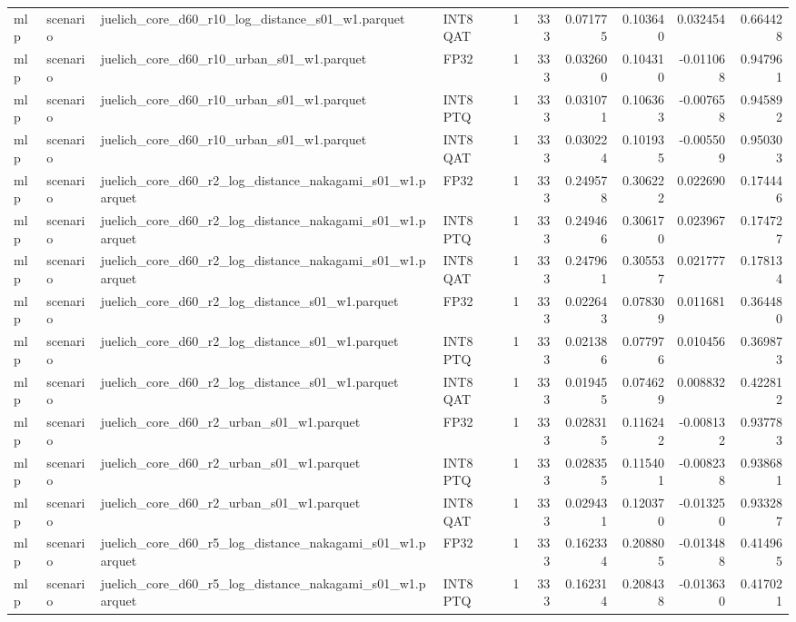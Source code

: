 \begin{tabular}{llllrrrrrr}
mlp & scenario & juelich\_core\_d60\_r10\_log\_distance\_s01\_w1.parquet & INT8 QAT & 1 & 333 & 0.071775 & 0.103640 & 0.032454 & 0.664428 \\
mlp & scenario & juelich\_core\_d60\_r10\_urban\_s01\_w1.parquet & FP32 & 1 & 333 & 0.032600 & 0.104310 & -0.011068 & 0.947961 \\
mlp & scenario & juelich\_core\_d60\_r10\_urban\_s01\_w1.parquet & INT8 PTQ & 1 & 333 & 0.031071 & 0.106363 & -0.007658 & 0.945892 \\
mlp & scenario & juelich\_core\_d60\_r10\_urban\_s01\_w1.parquet & INT8 QAT & 1 & 333 & 0.030224 & 0.101935 & -0.005509 & 0.950303 \\
mlp & scenario & juelich\_core\_d60\_r2\_log\_distance\_nakagami\_s01\_w1.parquet & FP32 & 1 & 333 & 0.249578 & 0.306222 & 0.022690 & 0.174446 \\
mlp & scenario & juelich\_core\_d60\_r2\_log\_distance\_nakagami\_s01\_w1.parquet & INT8 PTQ & 1 & 333 & 0.249466 & 0.306170 & 0.023967 & 0.174727 \\
mlp & scenario & juelich\_core\_d60\_r2\_log\_distance\_nakagami\_s01\_w1.parquet & INT8 QAT & 1 & 333 & 0.247961 & 0.305537 & 0.021777 & 0.178134 \\
mlp & scenario & juelich\_core\_d60\_r2\_log\_distance\_s01\_w1.parquet & FP32 & 1 & 333 & 0.022643 & 0.078309 & 0.011681 & 0.364480 \\
mlp & scenario & juelich\_core\_d60\_r2\_log\_distance\_s01\_w1.parquet & INT8 PTQ & 1 & 333 & 0.021386 & 0.077976 & 0.010456 & 0.369873 \\
mlp & scenario & juelich\_core\_d60\_r2\_log\_distance\_s01\_w1.parquet & INT8 QAT & 1 & 333 & 0.019455 & 0.074629 & 0.008832 & 0.422812 \\
mlp & scenario & juelich\_core\_d60\_r2\_urban\_s01\_w1.parquet & FP32 & 1 & 333 & 0.028315 & 0.116242 & -0.008132 & 0.937783 \\
mlp & scenario & juelich\_core\_d60\_r2\_urban\_s01\_w1.parquet & INT8 PTQ & 1 & 333 & 0.028355 & 0.115401 & -0.008238 & 0.938681 \\
mlp & scenario & juelich\_core\_d60\_r2\_urban\_s01\_w1.parquet & INT8 QAT & 1 & 333 & 0.029431 & 0.120370 & -0.013250 & 0.933287 \\
mlp & scenario & juelich\_core\_d60\_r5\_log\_distance\_nakagami\_s01\_w1.parquet & FP32 & 1 & 333 & 0.162334 & 0.208805 & -0.013488 & 0.414965 \\
mlp & scenario & juelich\_core\_d60\_r5\_log\_distance\_nakagami\_s01\_w1.parquet & INT8 PTQ & 1 & 333 & 0.162314 & 0.208438 & -0.013630 & 0.417021 \\

\end{tabular}
